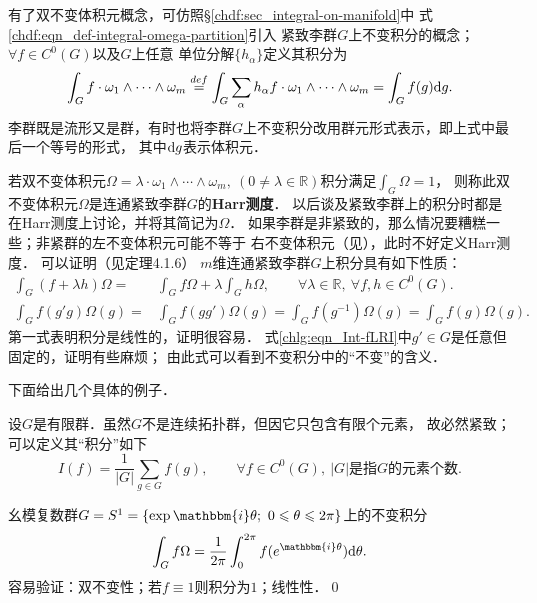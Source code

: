 有了双不变体积元概念，可仿照\S\ref{chdf:sec_integral-on-manifold}中
式\eqref{chdf:eqn_def-integral-omega-partition}引入
紧致李群$G$上{\heiti 不变积分}的概念；$\forall f\in C^0(G)$以及$G$上任意
单位分解$\{h_\alpha\}$定义其积分为
\begin{equation}
    \int_{G} f \cdot \omega_1 \wedge\cdots\wedge\omega_m \overset{def}{=} 
    \int_{G} \sum_{\alpha}  h_\alpha f \cdot  \omega_1 \wedge\cdots\wedge\omega_m 
    =\int_{G} f(g) {\rm d}g .
\end{equation}
李群既是流形又是群，有时也将李群$G$上不变积分改用群元形式表示，即上式中最后一个等号的形式，
其中${\rm d}g$表示体积元．



若双不变体积元$\Omega=\lambda \cdot \omega_1 \wedge\cdots\wedge\omega_m,\ 
(0\neq\lambda\in \mathbb{R})$积分满足$\int_{G}\Omega {=} 1$，
则称此双不变体积元$\Omega$是连通紧致李群$G$的{\heiti \bfseries Harr测度}．
以后谈及紧致李群上的积分时都是在Harr测度上讨论，并将其简记为$\Omega$．
如果李群是非紧致的，那么情况要糟糕一些；非紧群的左不变体积元可能不等于
右不变体积元（见\parencite[\S 6.1]{Miller-1973}），此时不好定义Harr测度．
可以证明（见\parencite[p.289]{xuyc-2001}定理4.1.6）
$m$维连通紧致李群$G$上积分具有如下性质：
\setlength{\mathindent}{0em}
\begin{align}
    \int_{G} (f+\lambda h) \Omega =& \int_{G} f \Omega +\lambda \int_{G}  h \Omega,
    \qquad \forall \lambda\in \mathbb{R},\  \forall f,h\in C^0(G). \\
    \int_{G} f(g' g) \Omega(g)=& \int_{G} f(g g') \Omega(g)
    = \int_{G} f(g^{-1}) \Omega(g) = \int_{G} f(g) \Omega(g) .
    \label{chlg:eqn_Int-fLRI}
\end{align}\setlength{\mathindent}{2em}
第一式表明积分是线性的，证明很容易．
式\eqref{chlg:eqn_Int-fLRI}中$g'\in G$是任意但固定的，证明有些麻烦；
由此式可以看到不变积分中的“不变”的含义． 


下面给出几个具体的例子．
\begin{example}
    设$G$是有限群．虽然$G$不是连续拓扑群，但因它只包含有限个元素，
    故必然紧致；可以定义其“积分”如下
    \begin{equation}
        I(f)= \frac{1}{|G|} \sum_{g\in G} f(g),\qquad
        \forall f\in C^0(G),\ |G|\text{是指}G\text{的元素个数}.
    \end{equation}
\end{example}

\begin{example}
    幺模复数群$G=S^1=\{\exp\mathbbm{i}\theta;\ 0\leqslant \theta \leqslant 2\pi\}$上的不变积分
    \begin{equation}
        \int_{G} f \Omega = \frac{1}{2\pi} \int_{0}^{2\pi} f(e^{\mathbbm{i}\theta}) {\rm d}\theta .
    \end{equation}
    容易验证：双不变性；若$f\equiv 1$则积分为$1$；线性性．\qed
\end{example}


